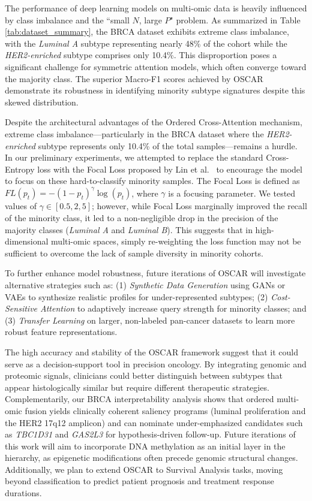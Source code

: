 \documentclass[lettersize,journal]{IEEEtran}
\begin{document}
The performance of deep learning models on multi-omic data is heavily influenced by class imbalance and the ``small $N$, large $P$" problem. As summarized in Table \ref{tab:dataset_summary}, the BRCA dataset exhibits extreme class imbalance, with the \textit{Luminal A} subtype representing nearly 48\% of the cohort while the \textit{HER2-enriched} subtype comprises only 10.4\%. This disproportion poses a significant challenge for symmetric attention models, which often converge toward the majority class. The superior Macro-F1 scores achieved by OSCAR demonstrate its robustness in identifying minority subtype signatures despite this skewed distribution.

Despite the architectural advantages of the Ordered Cross-Attention mechanism, extreme class imbalance—particularly in the BRCA dataset where the \textit{HER2-enriched} subtype represents only 10.4\% of the total samples—remains a hurdle. In our preliminary experiments, we attempted to replace the standard Cross-Entropy loss with the Focal Loss proposed by Lin et al.~\cite{FocalLoss2017} to encourage the model to focus on these hard-to-classify minority samples. The Focal Loss is defined as $FL(p_t) = -(1-p_t)^\gamma \log(p_t)$, where $\gamma$ is a focusing parameter. We tested values of $\gamma \in [0.5, 2, 5]$; however, while Focal Loss marginally improved the recall of the minority class, it led to a non-negligible drop in the precision of the majority classes (\textit{Luminal A} and \textit{Luminal B}). This suggests that in high-dimensional multi-omic spaces, simply re-weighting the loss function may not be sufficient to overcome the lack of sample diversity in minority cohorts.

To further enhance model robustness, future iterations of OSCAR will investigate alternative strategies such as: (1) \textit{Synthetic Data Generation} using GANs or VAEs to synthesize realistic profiles for under-represented subtypes; (2) \textit{Cost-Sensitive Attention} to adaptively increase query strength for minority classes; and (3) \textit{Transfer Learning} on larger, non-labeled pan-cancer datasets to learn more robust feature representations.

The high accuracy and stability of the OSCAR framework suggest that it could serve as a decision-support tool in precision oncology. By integrating genomic and proteomic signals, clinicians could better distinguish between subtypes that appear histologically similar but require different therapeutic strategies. Complementarily, our BRCA interpretability analysis shows that ordered multi-omic fusion yields clinically coherent saliency programs (luminal proliferation and the HER2 17q12 amplicon) and can nominate under-emphasized candidates such as \textit{TBC1D31} and \textit{GAS2L3} for hypothesis-driven follow-up. Future iterations of this work will aim to incorporate DNA methylation as an initial layer in the hierarchy, as epigenetic modifications often precede genomic structural changes. Additionally, we plan to extend OSCAR to Survival Analysis tasks, moving beyond classification to predict patient prognosis and treatment response durations.
\end{document}
